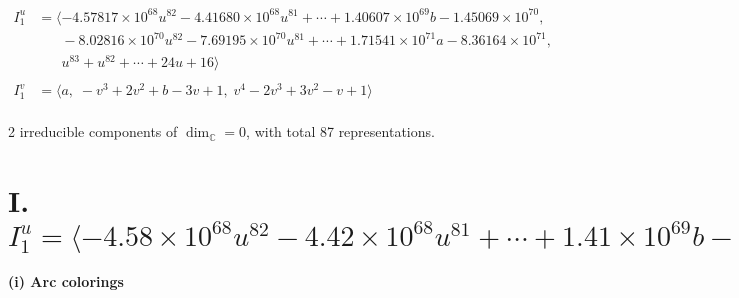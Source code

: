 \documentclass[1p]{elsarticle_modified}
\theoremstyle{definition}
\begin{document}
\begin{align*}
I^u_{1}&=\langle 
-4.57817\times10^{68} u^{82}-4.41680\times10^{68} u^{81}+\cdots+1.40607\times10^{69} b-1.45069\times10^{70},\\
\phantom{I^u_{1}}&\phantom{= \langle  }-8.02816\times10^{70} u^{82}-7.69195\times10^{70} u^{81}+\cdots+1.71541\times10^{71} a-8.36164\times10^{71},\\
\phantom{I^u_{1}}&\phantom{= \langle  }u^{83}+u^{82}+\cdots+24 u+16\rangle \\
\\
I^v_{1}&=\langle 
a,\;- v^3+2 v^2+b-3 v+1,\;v^4-2 v^3+3 v^2- v+1\rangle \\
\end{align*}
\raggedright * 2 irreducible components of $\dim_{\mathbb{C}}=0$, with total 87 representations.\\
\newpage
\renewcommand{\arraystretch}{1}
\centering \section*{I. $I^u_{1}= \langle -4.58\times10^{68} u^{82}-4.42\times10^{68} u^{81}+\cdots+1.41\times10^{69} b-1.45\times10^{70},\;-8.03\times10^{70} u^{82}-7.69\times10^{70} u^{81}+\cdots+1.72\times10^{71} a-8.36\times10^{71},\;u^{83}+u^{82}+\cdots+24 u+16 \rangle$}
\flushleft \textbf{(i) Arc colorings}\\
\end{document}
